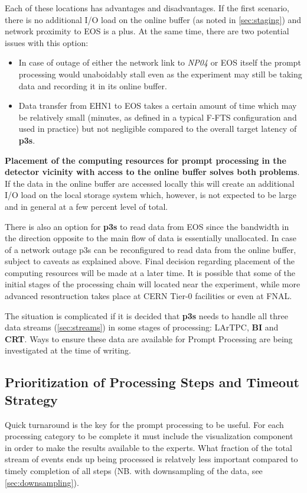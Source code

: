 \documentclass[pdftex,12pt,letter]{article}
\newcommand{\expname}{\textit{NP04}\xspace}
\newcommand{\PP}{Prompt Processing\xspace}
\newcommand{\PPS}{\textbf{p3s}\xspace}
\begin{document}
\noindent Each of these locations has advantages and disadvantages. If the first scenario,
there is no additional I/O load on the online buffer (as noted in \ref{sec:staging}) and network proximity
to EOS is a plus. At the same time, there are two potential issues with this option:
\begin{itemize}
\item  In case of outage of either the network link to \expname or EOS itself
the prompt processing would unaboidably stall even as the experiment may still be taking data and recording
it in its online buffer. 
\item Data transfer from EHN1 to EOS takes a certain amount of time which may be relatively small (minutes, as defined
in a typical F-FTS configuration and used in practice)
but not negligible compared to the overall target latency of \PPS.
\end{itemize}


\noindent \textbf{Placement of the computing resources for prompt processing in the detector
vicinity with access to the online buffer solves both problems}. If the data in the online buffer are accessed locally
this will create an additional I/O load on the local storage system which, however, is
not expected to be large and in general at a few percent level of total.

There is also an option for \PPS
to read data from EOS since the bandwidth in the direction opposite to the main flow of data
is essentially unallocated. In case of a network outage p3s can be reconfigured to read
data from the online buffer, subject to caveats as explained above.
Final decision regarding placement of the computing resources will be made at a later time.
It is possible that some of the initial stages of the processing chain will located near the
experiment, while more advanced resontruction takes place at CERN Tier-0 facilities or even at FNAL.

The situation is complicated if it is decided that \PPS needs to handle all three data streams
(\ref{sec:streams}) in some stages of processing: LArTPC, \textbf{BI} and \textbf{CRT}.
Ways to ensure these data are available for \PP are being investigated at the time of writing.

\subsection{Prioritization of Processing Steps and Timeout Strategy}
\label{sec:priority}
Quick turnaround is the key for the prompt processing to be useful. For each processing category
to be complete it must include the visualization component in order to make the results available
to the experts. What fraction of the total stream of events ends up being processed is relatvely less
important compared to timely completion of all steps (NB. with downsampling of the data, see 
\ref{sec:downsampling}).
\end{document}
